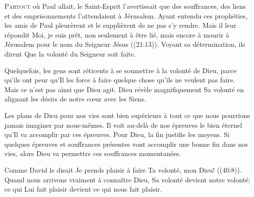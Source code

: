 



\lettrine{P}{artout} où Paul allait, le Saint-Esprit l'avertissait
 que des souffrances, des liens et des emprisonnements l'attendaient
 à Jérusalem. Ayant entendu ces prophéties, les amis de Paul pleurèrent
 et le supplièrent de ne pas s'y rendre. Mais il leur répondit\frcolon{}
 \Og Moi, je suis prêt, non seulement à être lié,
 mais encore à mourir à Jérusalem pour le nom du Seigneur Jésus \Fg{}
 ((21:13)). Voyant sa détermination, ils dirent\frcolon{} 
 \Og Que la volonté du Seigneur soit faite. \Fg{}


Quelquefois, les gens sont réticents à se soumettre à la volonté de Dieu,
 parce qu'ils ont peur qu'Il les force à faire quelque chose
 qu'ils ne veulent pas faire. Mais ce n'est pas ainsi que Dieu agit.
 Dieu révèle magnifiquement Sa volonté en alignant les désirs de notre
 c\oe{}ur avec les Siens.

Les plans de Dieu pour nos vies sont bien supérieurs à tout
 ce que nous pourrions jamais imaginer par nous-mêmes.
 Il voit au-delà de nos épreuves le bien éternel qu'Il va accomplir
 par ces épreuves. Pour Dieu, la fin justifie les moyens.
 Si quelques épreuves et souffrances présentes vont accomplir
 une bonne fin dans nos vies, alors Dieu va permettre
 ces souffrances momentanées.

Comme David le disait\frcolon{} 
 \Og Je prends plaisir à faire Ta volonté, mon Dieu! \Fg{}
 ((40:8)). Quand nous arrivons vraiment à connaître Dieu,
 Sa volonté devient notre volonté; ce qui Lui fait plaisir
 devient ce qui nous fait plaisir.

\dvrule



